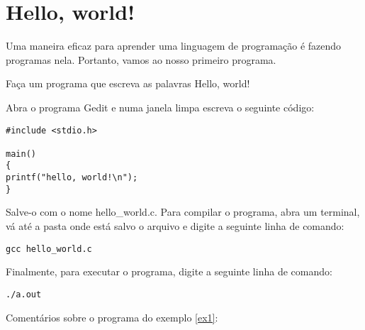 \section{Hello, world!}
Uma maneira eficaz para aprender uma linguagem de programação é fazendo programas nela. Portanto, vamos ao nosso primeiro programa.
\begin{ex}\label{ex1} Faça um programa que escreva as palavras Hello, world!
\end{ex}
Abra o programa Gedit e numa janela limpa escreva o seguinte código:
\begin{verbatim}
#include <stdio.h>

main()
{
printf("hello, world!\n");
}
\end{verbatim}
Salve-o com o nome hello\_world.c. Para compilar o programa, abra um terminal, vá até a pasta onde está salvo o arquivo e digite a seguinte linha de comando:
\begin{verbatim}
gcc hello_world.c
\end{verbatim}
Finalmente, para executar o programa, digite a seguinte linha de comando:
\begin{verbatim}
./a.out
\end{verbatim}
Comentários sobre o programa do exemplo \ref{ex1}:

